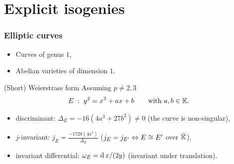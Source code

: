 \documentclass[10pt]{beamer}
\begin{document}

\section{Explicit isogenies}

\begin{frame}
  \frametitle{Elliptic curves}

  \begin{itemize}
  \item Curves of genus $1$,
  \item Abelian varieties of dimension $1$.
  \end{itemize}
  
  \begin{block}{(Short) Weierstrass form}
    Assuming $p\ne2,3$
    {\large
      \begin{equation*}
        E\;:\;y^2 = x^3 + ax + b\qquad\text{with $a,b\in\mathbb{K}$.}
      \end{equation*}
    }
    \begin{itemize}
    \item discriminant: \alert{$\Delta_E = -16(4a^3 + 27b^2) \ne 0$} (the curve is non-singular),
    \item $j$-invariant: \alert{$j_E=\frac{-1728(4a^3)}{\Delta_E}$}
      ($j_E=j_{E'} \Leftrightarrow E\cong E'$ over $\bar{\mathbb{K}}$),
    \item invariant differential: \alert{$\omega_E= \operatorname{d} x/(2y)$} (invariant under translation).
    \end{itemize}
  \end{block}
\end{frame}


\end{document}
